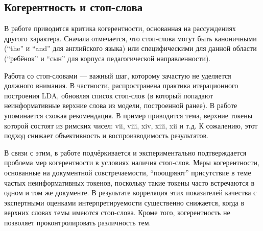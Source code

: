 






\subsection{Когерентность и стоп-слова}

В работе \cite{fan2019assessing} приводится критика когерентности, основанная на рассуждениях другого характера. Сначала отмечается, что стоп-слова могут быть каноничными (``the'' и ``and'' для английского языка) или специфическими для данной области (``ребёнок'' и ``сын'' для корпуса педагогической направленности). 

Работа со стоп-словами --- важный шаг, которому зачастую не уделяется должного внимания. В частности, распространена практика итерационного построения LDA, обновляя список стоп-слов (в который попадают неинформативные верхние слова из модели, построенной ранее). В работе \cite{boydcare} упоминается схожая рекомендация. В пример приводится тема, верхние токены которой состоят из римских чисел: vii, viii, xiv, xiii, xii и т.д. К сожалению, этот подход снижает объективность и воспроизводимость результатов.

В связи с этим, в работе \cite{fan2019assessing} подчёркивается и экспериментально подтверждается проблема мер когерентности в условиях наличия стоп-слов. Меры когерентности, основанные на документной совстречаемости, ``поощряют'' присутствие в теме частых неинформативных токенов, поскольку такие токены часто встречаются в одном и том же документе. В результате корреляция
этих показателей качества с экспертными оценками интерпретируемости существенно снижается, когда в верхних словах темы имеются стоп-слова. Кроме того, когерентность не позволяет проконтролировать различность тем.

